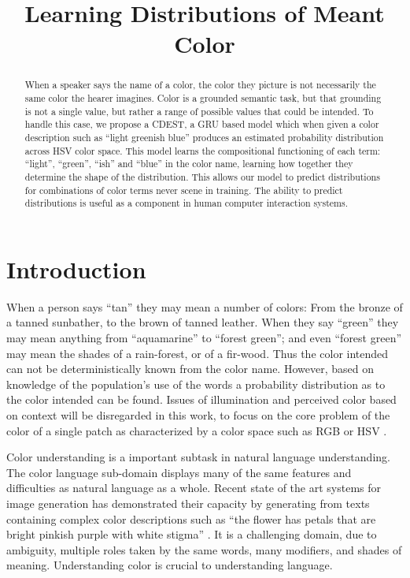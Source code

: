 \documentclass[11pt,letterpaper]{article}
\title{Learning Distributions of Meant Color}
\author{}
\date{}
\newcommand{\parencite}{\cite}
\begin{document}
\maketitle

\begin{abstract}
When a speaker says the name of a color, the color they picture is not necessarily the same color the hearer imagines.
Color is a grounded semantic task, but that grounding is not a single value, but rather a range of possible values that could be intended.
To handle this case, we propose a CDEST, a GRU based model which when given a color description such as ``light greenish blue'' produces an estimated probability distribution across HSV color space.
This model learns the compositional functioning of each term: ``light'', ``green'', ``ish'' and ``blue'' in the color name, learning how together they determine the shape of the distribution.
This allows our model to predict distributions for combinations of color terms never scene in training.
The ability to predict distributions is useful as a component in human computer interaction systems.
\end{abstract}

\section{Introduction}
When a person says ``tan'' they may mean a number of colors: From the bronze of a tanned sunbather, to the brown of tanned leather.
When they say ``green'' they may mean anything from ``aquamarine'' to ``forest green'';
 and even ``forest green'' may mean the shades of a rain-forest, or of a fir-wood.
Thus the color intended can not be deterministically known from the color name.
However, based on knowledge of the population's use of the words a probability distribution as to the color intended can be found.
Issues of illumination and perceived color based on context will be disregarded in this work, to focus on the core problem of the color of a single patch as characterized by a color space such as RGB or HSV \parencite{smith1978color}.


Color understanding is a important subtask in natural language understanding.
The color language sub-domain displays many of the same features and difficulties as natural language as a whole.
Recent state of the art systems for image generation has demonstrated their capacity by generating from texts containing complex color descriptions such as ``the flower has petals that 
are bright pinkish purple with white stigma'' \parencite{reed2016generative, 2015arXiv151102793M}.
It is a challenging domain, due to ambiguity, multiple roles taken by the same words, many modifiers, and shades of meaning.
Understanding color is crucial to understanding language. 
\end{document}
